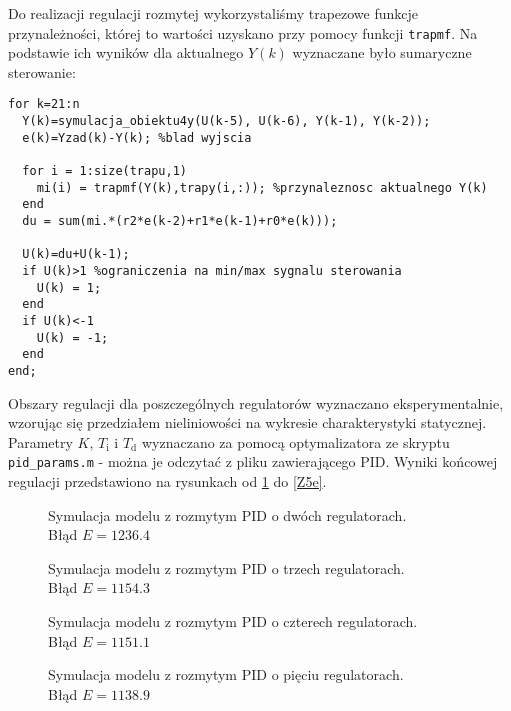 Do realizacji regulacji rozmytej wykorzystaliśmy trapezowe funkcje przynależności, której to wartości uzyskano przy pomocy funkcji \verb|trapmf|. Na podstawie ich wyników dla aktualnego $ Y(k) $ wyznaczane było sumaryczne sterowanie:

\begin{lstlisting}[style=Matlab-editor]
%glowna petla PID
for k=21:n
  Y(k)=symulacja_obiektu4y(U(k-5), U(k-6), Y(k-1), Y(k-2));
  e(k)=Yzad(k)-Y(k); %blad wyjscia

  for i = 1:size(trapu,1)
    mi(i) = trapmf(Y(k),trapy(i,:)); %przynaleznosc aktualnego Y(k)
  end
  du = sum(mi.*(r2*e(k-2)+r1*e(k-1)+r0*e(k)));

  U(k)=du+U(k-1);
  if U(k)>1 %ograniczenia na min/max sygnalu sterowania
    U(k) = 1;
  end
  if U(k)<-1
    U(k) = -1;
  end
end;
\end{lstlisting}

Obszary regulacji dla poszczególnych regulatorów wyznaczano eksperymentalnie, wzorując się przedziałem nieliniowości na wykresie charakterystyki statycznej. Parametry $ K $, $ T_\mathrm{i} $ i $ T_\mathrm{d} $ wyznaczano za pomocą optymalizatora ze skryptu \verb|pid_params.m| - można je odczytać z pliku zawierającego PID. Wyniki końcowej regulacji przedstawiono na rysunkach od \ref{Z5a} do \ref{Z5e}.


\begin{figure}[ht]
\centering

\caption{Symulacja modelu z rozmytym PID o dwóch regulatorach. \\Błąd $ E=\num{1236,4} $}
\label{Z5a}
\end{figure}

\begin{figure}[ht]
\centering

\caption{Symulacja modelu z rozmytym PID o trzech regulatorach. \\Błąd $ E=\num{1154,3} $}
\label{Z5b}
\end{figure}

\begin{figure}[ht]
\centering

\caption{Symulacja modelu z rozmytym PID o czterech regulatorach. \\Błąd $ E=\num{1151,1} $}
\label{Z5c}
\end{figure}

\begin{figure}[ht]
\centering

\caption{Symulacja modelu z rozmytym PID o pięciu regulatorach. \\
Błąd $ E=\num{1138,9} $}
\label{Z5d}
\end{figure}

